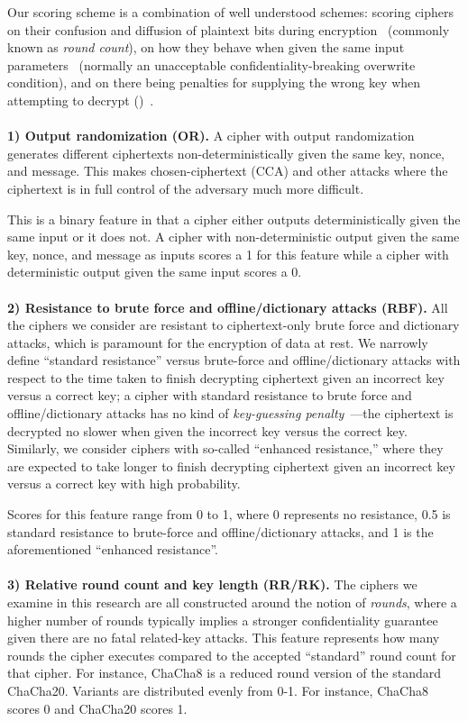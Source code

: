 Our scoring scheme is a combination of well understood schemes: scoring ciphers
on their confusion and diffusion of plaintext bits during
encryption~\cite{MicrosoftCryptanalysisAES,SchneiersOnRounds} (commonly known as
\emph{round count}), on how they behave when given the same input
parameters~\cite{random-output1,Freestyle,random-output2} (normally an
unacceptable confidentiality-breaking overwrite condition), and on there being
penalties for supplying the wrong key when attempting to decrypt ()~\cite{scrypt,Freestyle,others2}.\\
\\
\textbf{1) Output randomization (OR).} A cipher with output randomization
generates different ciphertexts non-deterministically given the same key, nonce,
and message. This makes chosen-ciphertext (CCA) and other attacks where the
ciphertext is in full control of the adversary much more difficult.

This is a binary feature in that a cipher either outputs deterministically given
the same input or it does not. A cipher with non-deterministic output given the
same key, nonce, and message as inputs scores a 1 for this feature while a
cipher with deterministic output given the same input scores a 0.\\
\\
\textbf{2) Resistance to brute force and offline/dictionary attacks (RBF).}
All the ciphers we consider are resistant to ciphertext-only brute force and
dictionary attacks, which is paramount for the encryption of data at rest. We
narrowly define ``standard resistance'' versus brute-force and
offline/dictionary attacks with respect to the time taken to finish decrypting
ciphertext given an incorrect key versus a correct key; a cipher with standard
resistance to brute force and offline/dictionary attacks has no kind of
\emph{key-guessing penalty}~\cite{Freestyle}---the ciphertext is decrypted no
slower when given the incorrect key versus the correct key. Similarly, we
consider ciphers with so-called ``enhanced resistance,'' where they are expected
to take longer to finish decrypting ciphertext given an incorrect key versus a
correct key with high probability.

Scores for this feature range from 0 to 1, where 0 represents no resistance, 0.5
is standard resistance to brute-force and offline/dictionary attacks, and 1 is
the aforementioned ``enhanced resistance''.\\
\\
\textbf{3) Relative round count and key length (RR/RK).} The ciphers we examine
in this research are all constructed around the notion of \emph{rounds}, where a
higher number of rounds typically implies a stronger confidentiality guarantee
given there are no fatal related-key attacks. This feature represents how many
rounds the cipher executes compared to the accepted ``standard'' round count for
that cipher. For instance, ChaCha8 is a reduced round version of the standard
ChaCha20. Variants are distributed evenly from 0-1. For instance, ChaCha8 scores
0 and ChaCha20 scores 1\@.

